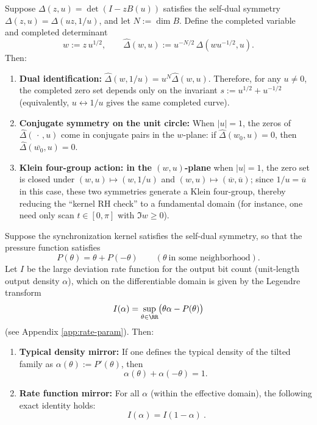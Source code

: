 \begin{remark}\label{prop:completed-zero-symmetry}
Suppose \(\Delta(z,u)=\det(I-zB(u))\) satisfies the self-dual symmetry \(\Delta(z,u)=\Delta(uz,1/u)\), and let \(N:=\dim B\).
Define the completed variable and completed determinant
\[
w:=z\,u^{1/2},\qquad
\widehat{\Delta}(w,u):=u^{-N/2}\,\Delta(wu^{-1/2},u).
\]
Then:
\begin{enumerate}
  \item \textbf{Dual identification:} \(\widehat{\Delta}(w,1/u)=u^{N}\widehat{\Delta}(w,u)\). Therefore, for any \(u\neq 0\), the completed zero set depends only on the invariant
  \(s:=u^{1/2}+u^{-1/2}\) (equivalently, \(u\leftrightarrow 1/u\) gives the same completed curve).
  \item \textbf{Conjugate symmetry on the unit circle:} When \(|u|=1\), the zeros of \(\widehat{\Delta}(\,\cdot\,,u)\) come in conjugate pairs in the \(w\)-plane: if \(\widehat{\Delta}(w_0,u)=0\), then \(\widehat{\Delta}(\overline{w_0},u)=0\).
  \item \textbf{Klein four-group action: in the \((w,u)\)-plane} when \(|u|=1\), the zero set is closed under
  \((w,u)\mapsto (w,1/u)\) and \((w,u)\mapsto(\overline{w},\overline{u})\); since \(1/u=\overline{u}\) in this case, these two symmetries generate a Klein four-group, thereby reducing the ``kernel RH check'' to a fundamental domain (for instance, one need only scan \(t\in[0,\pi]\) with \(\Im w\ge 0\)).
\end{enumerate}
\end{remark}

\begin{remark}[Pressure symmetry \texorpdfstring{$\Rightarrow$}{=>} exact mirror of the large deviation spectrum]\label{thm:sync-pressure-sym-ldp-mirror}
Suppose the synchronization kernel satisfies the self-dual symmetry, so that the pressure function satisfies
\[
P(\theta)=\theta+P(-\theta)
\qquad(\theta\ \text{in some neighborhood}).
\]
Let \(I\) be the large deviation rate function for the output bit count (unit-length output density \(\alpha\)), which on the differentiable domain is given by the Legendre transform
\[
I(\alpha)=\sup_{\theta\in\RR}\bigl(\theta\alpha-P(\theta)\bigr)
\]
(see Appendix \ref{app:rate-param}). Then:
\begin{enumerate}
  \item \textbf{Typical density mirror:} If one defines the typical density of the tilted family as \(\alpha(\theta):=P'(\theta)\), then
  \[
  \alpha(\theta)+\alpha(-\theta)=1.
  \]
  \item \textbf{Rate function mirror:} For all \(\alpha\) (within the effective domain), the following exact identity holds:
  \[
  \boxed{\ I(\alpha)=I(1-\alpha)\ }.
  \]
\end{enumerate}
\end{remark}

